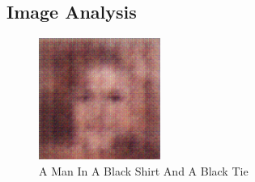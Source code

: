 \documentclass{article}%
\begin{document}
%
\subsection{Image Analysis}%
\label{subsec:ImageAnalysis}%


\begin{figure}[h!]%
\centering%
\includegraphics[width=150px]{500_fake_images/samples_5_389.png}%
\caption{A Man In A Black Shirt And A Black Tie}%
\end{figure}

%
\end{document}
